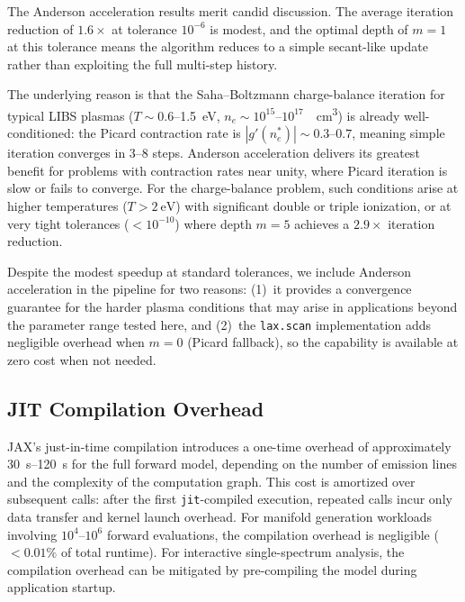 The Anderson acceleration results merit candid discussion.
The average iteration reduction of $1.6\times$ at tolerance $10^{-6}$ is modest,
and the optimal depth of $m = 1$ at this tolerance means the algorithm reduces to a simple secant-like update rather than exploiting the full multi-step history.

The underlying reason is that the Saha--Boltzmann charge-balance iteration for typical LIBS plasmas ($T \sim 0.6$--\SI{1.5}{\electronvolt}, $n_e \sim 10^{15}$--$10^{17}$~\si{\per\cubic\centi\metre}) is already well-conditioned: the Picard contraction rate is $|g'(n_e^*)| \sim 0.3$--$0.7$, meaning simple iteration converges in 3--8 steps.
Anderson acceleration delivers its greatest benefit for problems with contraction rates near unity, where Picard iteration is slow or fails to converge.
For the charge-balance problem, such conditions arise at higher temperatures ($T > \SI{2}{\electronvolt}$) with significant double or triple ionization, or at very tight tolerances ($< 10^{-10}$) where depth $m = 5$ achieves a $2.9\times$ iteration reduction.

Despite the modest speedup at standard tolerances, we include Anderson acceleration in the pipeline for two reasons: (1)~it provides a convergence guarantee for the harder plasma conditions that may arise in applications beyond the parameter range tested here, and (2)~the \texttt{lax.scan} implementation adds negligible overhead when $m = 0$ (Picard fallback), so the capability is available at zero cost when not needed.

\subsection{JIT Compilation Overhead}

JAX's just-in-time compilation introduces a one-time overhead of approximately \SIrange{30}{120}{\second} for the full forward model, depending on the number of emission lines and the complexity of the computation graph.
This cost is amortized over subsequent calls: after the first \texttt{jit}-compiled execution, repeated calls incur only data transfer and kernel launch overhead.
For manifold generation workloads involving $10^4$--$10^6$ forward evaluations, the compilation overhead is negligible ($< 0.01\%$ of total runtime).
For interactive single-spectrum analysis, the compilation overhead can be mitigated by pre-compiling the model during application startup.

